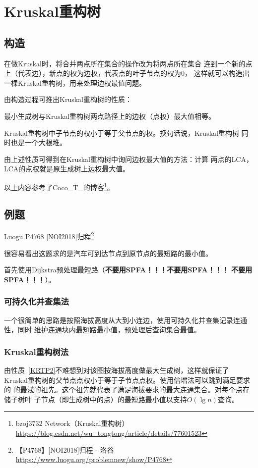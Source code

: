 \section{Kruskal重构树}
\subsection{构造}
在做Kruskal时，将合并两点所在集合的操作改为将两点所在集合
连到一个新的点上（代表边），新点的权为边权，代表点的叶子节点的权为0，
这样就可以构造出一棵Kruskal重构树，用来处理边权最值问题。

由构造过程可推出Kruskal重构树的性质：

\begin{property}
	最小生成树与Kruskal重构树两点路径上的边权（点权）最大值相等。
\end{property}
\begin{property}\label{KRTP2}
	Kruskal重构树中子节点的权小于等于父节点的权。换句话说，Kruskal重构树
	同时也是一个大根堆。
\end{property}
由上述性质可得到在Kruskal重构树中询问边权最大值的方法：计算
两点的LCA，LCA的点权就是原生成树上边权最大值。

以上内容参考了Coco\_T\_的博客\footnote{
	bzoj3732 Network（Kruskal重构树）
	\url{https://blog.csdn.net/wu_tongtong/article/details/77601523}
}。
\subsection{例题}
Luogu P4768 [NOI2018]归程\footnote{
【P4768】[NOI2018]归程 - 洛谷
\url{https://www.luogu.org/problemnew/show/P4768}
}

很容易看出这题求的是汽车可到达节点到原节点的最短路的最小值。

首先使用Dijkstra预处理最短路（{\bfseries 不要用SPFA！！！不要用SPFA！！！
不要用SPFA！！！}）。

\subsubsection{可持久化并查集法}
一个很简单的思路是按照海拔高度从大到小连边，使用可持久化并查集记录连通性，同时
维护连通块内最短路最小值，预处理后查询集合最值。

\subsubsection{Kruskal重构树法}
由性质~\ref{KRTP2}不难想到对该图按海拔高度做最大生成树，这样就保证了
Kruskal重构树的父节点点权小于等于子节点点权。使用倍增法可以跳到满足要求的
的最浅的祖先。这个祖先就代表了满足海拔要求的最大连通集合。对每个点存储子树叶
子节点（即生成树中的点）的最短路最小值以支持$O(\lg n)$查询。

